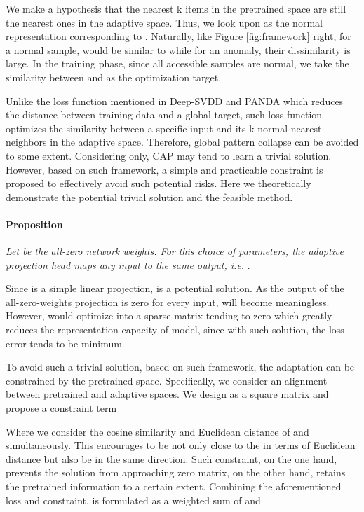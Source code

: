 \documentclass{article}
\begin{document}
We make a hypothesis that the nearest k items in the pretrained space are still the nearest ones in the adaptive space. Thus, we look upon  as the normal representation corresponding to .  Naturally, like Figure \ref{fig:framework} right, for a normal sample,  would be similar to  while for an anomaly, their dissimilarity is large. In the training phase, since all accessible samples are normal, we take the similarity between  and  as the optimization target. 



Unlike the loss function mentioned in Deep-SVDD and PANDA which reduces the distance between training data and a global target, such loss function optimizes the similarity between a specific input and its k-normal nearest neighbors in the adaptive space. Therefore, global pattern collapse can be avoided to some extent. Considering  only, CAP may tend to learn a trivial solution. However, based on such framework, a simple and practicable constraint is proposed to effectively avoid such potential risks. Here we theoretically demonstrate the potential trivial solution and the feasible method.

\paragraph{Proposition} \textit{Let  be the all-zero network weights. For this choice of parameters, the adaptive projection head maps any input to the same output, i.e. }.

Since  is a simple linear projection,  is a potential solution. As the output of the all-zero-weights projection is zero for every input,  will become meaningless. However,  would optimize  into a sparse matrix tending to zero which greatly reduces the representation capacity of model, since with such solution, the loss error tends to be minimum.

To avoid such a trivial solution, based on such framework, the adaptation can be constrained by the pretrained space. Specifically, we consider an alignment between pretrained and adaptive spaces. We design  as a square matrix and propose a constraint term



Where we consider the cosine similarity and Euclidean distance of  and   simultaneously. This encourages  to be not only close to the  in terms of Euclidean distance but also be in the same direction. Such constraint, on the one hand, prevents the solution from approaching zero matrix, on the other hand, retains the pretrained information to a certain extent. Combining the aforementioned loss and constraint,  is formulated as a weighted sum of  and 
\end{document}
